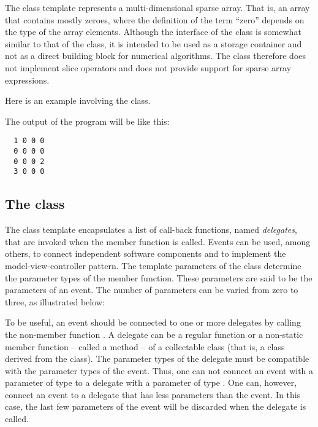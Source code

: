The class template  represents a multi-dimensional
sparse array. That is, an array that contains mostly zeroes, where the
definition of the term ``zero'' depends on the type of the array
elements. Although the interface of the  class is
somewhat similar to that of the  class, it is intended to be
used as a storage container and not as a direct building block for
numerical algorithms. The  class therefore does not
implement slice operators and does not provide support for sparse array
expressions.

Here is an example involving the  class.


The output of the program will be like this:

\begin{Verbatim}
  1 0 0 0
  0 0 0 0
  0 0 0 2
  3 0 0 0
\end{Verbatim}


\subsection*{The  class}

The class template  encapsulates a list of call-back
functions, named \emph{delegates}, that are invoked when the
 member function is called. Events can be used, among
others, to connect independent software components and to implement the
model-view-controller pattern. The template parameters of the
 class determine the parameter types of the 
member function. These parameters are said to be the parameters of an
event. The number of parameters can be varied from zero to three, as
illustrated below:


To be useful, an event should be connected to one or more delegates
by calling the non-member function . A delegate can be a
regular function or a non-static member function -- called a method
-- of a collectable class (that is, a class derived from the
 class). The parameter types of the delegate must be
compatible with the parameter types of the event. Thus, one can not
connect an event with a parameter of type  to a delegate with
a parameter of type . One can, however, connect an event to a
delegate that has less parameters than the event. In this case, the
last few parameters of the event will be discarded when the delegate
is called.

